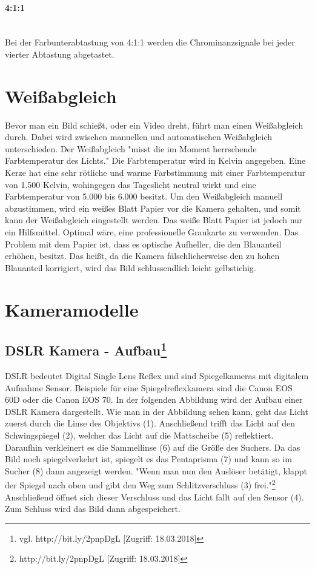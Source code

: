 \paragraph{4:1:1}
\leavevmode \\
Bei der Farbunterabtastung von 4:1:1 werden die Chrominanzsignale bei jeder vierter Abtastung abgetastet.
\section{Weißabgleich}
Bevor man ein Bild schießt, oder ein Video dreht, führt man einen Weißabgleich durch. Dabei wird zwischen manuellen und automatischen Weißabgleich unterschieden. Der Weißabgleich "misst die im Moment herrschende Farbtemperatur des Lichts." Die Farbtemperatur wird in Kelvin angegeben. Eine Kerze hat eine sehr rötliche und warme Farbstimmung mit einer Farbtemperatur von 1.500 Kelvin, wohingegen das Tageslicht neutral wirkt und eine Farbtemperatur von 5.000 bis 6.000 besitzt. Um den Weißabgleich manuell abzustimmen, wird ein weißes Blatt Papier vor die Kamera gehalten, und somit kann der Weißabgleich eingestellt werden. Das weiße Blatt Papier ist jedoch nur ein Hilfsmittel. Optimal wäre, eine professionelle Graukarte zu verwenden. Das Problem mit dem Papier ist, dass es optische Aufheller, die den Blauanteil erhöhen, besitzt. Das heißt, da die Kamera fälschlicherweise den zu hohen Blauanteil korrigiert, wird das Bild schlussendlich leicht gelbstichig. 
\section{Kameramodelle}
\subsection[DSLR Kamera - Aufbau]{DSLR Kamera - Aufbau\protect\footnote{\label{}vgl. http://bit.ly/2pnpDgL [Zugriff: 18.03.2018]}}
DSLR bedeutet Digital Single Lens Reflex und sind Spiegelkameras mit digitalem Aufnahme Sensor. Beispiele für eine Spiegelreflexkamera sind die Canon EOS 60D oder die Canon EOS 70. In der folgenden Abbildung wird der Aufbau einer DSLR Kamera dargestellt. Wie man in der Abbildung sehen kann, geht das Licht zuerst durch die Linse des Objektivs (1). Anschließend trifft das Licht auf den Schwingspiegel (2), welcher das Licht auf die Mattscheibe (5) reflektiert. Daraufhin verkleinert es die Sammellinse (6) auf die Größe des Suchers. Da das Bild noch spiegelverkehrt ist, spiegelt es das Pentaprisma (7) und kann so im Sucher (8) dann angezeigt werden. "Wenn man nun den Auslöser betätigt, klappt der Spiegel nach oben und gibt den Weg zum Schlitzverschluss (3) frei."\footnote{\label{}http://bit.ly/2pnpDgL [Zugriff: 18.03.2018]} Anschließend öffnet sich dieser Verschluss und das Licht fallt auf den Sensor (4). Zum Schluss wird das Bild dann abgespeichert.
